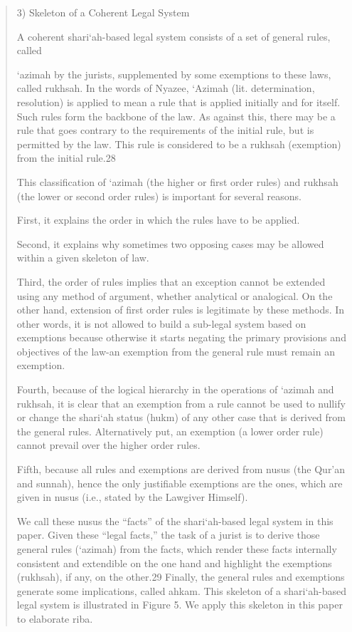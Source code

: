 \begin{quote}
3) Skeleton of a Coherent Legal System

A coherent shari‘ah-based legal system consists of a set of general rules, called

‘azimah by the jurists, supplemented by some exemptions to these laws, called rukhsah. In the words of Nyazee, ‘Azimah (lit. determination, resolution) is applied to mean a rule that is applied initially and for itself. Such rules form the backbone of the law. As against this, there may be a rule that goes contrary to the requirements of the initial rule, but is permitted by the law. This rule is considered to be a rukhsah (exemption) from the initial rule.28

This classification of ‘azimah (the higher or first order rules) and rukhsah (the lower or second order rules) is important for several reasons.

First, it explains the order in which the rules have to be applied.

Second, it explains why sometimes two opposing cases may be allowed within a given skeleton of law.

Third, the order of rules implies that an exception cannot be extended using any method of argument, whether analytical or analogical. On the other hand, extension of first order rules is legitimate by these methods. In other words, it is not allowed to build a sub-legal system based on exemptions because otherwise it starts negating the primary provisions and objectives of the law-an exemption from the general rule must remain an exemption.

Fourth, because of the logical hierarchy in the operations of ‘azimah and rukhsah, it is clear that an exemption from a rule cannot be used to nullify or change the shari‘ah status (hukm) of any other case that is derived from the general rules. Alternatively put, an exemption (a lower order rule) cannot prevail over the higher order rules.

Fifth, because all rules and exemptions are derived from nusus (the Qur'an and sunnah), hence the only justifiable exemptions are the ones, which are given in nusus (i.e., stated by the Lawgiver Himself).

We call these nusus the “facts” of the shari‘ah-based legal system in this paper. Given these “legal facts,” the task of a jurist is to derive those general rules (‘azimah) from the facts, which render these facts internally consistent and extendible on the one hand and highlight the exemptions (rukhsah), if any, on the other.29 Finally, the general rules and exemptions generate some implications, called ahkam. This skeleton of a shari‘ah-based legal system is illustrated in Figure 5. We apply this skeleton in this paper to elaborate riba.


\end{quote}
